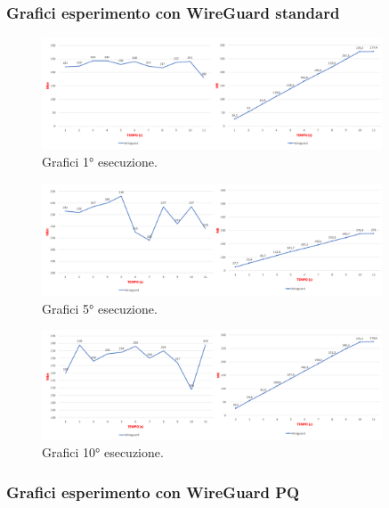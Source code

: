 \newpage
\subsubsection{Grafici esperimento con WireGuard standard}

\begin{figure}[h] \includegraphics[width=0.9\textwidth] {Tesi magistrale/capitoli/images/40.png}
\centering
\caption{Grafici 1° esecuzione.}
\end{figure}

\begin{figure}[h] \includegraphics[width=0.9\textwidth] {Tesi magistrale/capitoli/images/41.png}
\centering
\caption{Grafici 5° esecuzione.}
\end{figure}

\begin{figure}[h] \includegraphics[width=0.9\textwidth] {Tesi magistrale/capitoli/images/45.png}
\centering
\caption{Grafici 10° esecuzione.}
\end{figure}

\newpage
\subsubsection{Grafici esperimento con WireGuard PQ}

